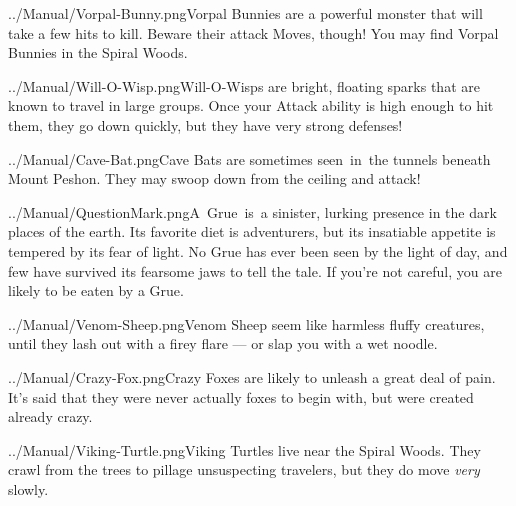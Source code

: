 \documentclass[9pt,twocolumn,openany,article]{memoir}
\newcommand\englishskip{\vspace{14pt}}
\begin{document}
{\lettrine[image=true,                lines=4,               findent=3pt,
nindent=3pt]{../Manual/Vorpal-Bunny.png}{}\noindent{}Vorpal  Bunnies are
a  powerful monster  that will  take a  few hits  to kill.  Beware their
attack Moves, though! You may find Vorpal Bunnies in the Spiral Woods.

\englishskip

\lettrine[image=true,                lines=4,               findent=3pt,
nindent=3pt]{../Manual/Will-O-Wisp.png}{}\noindent{}Will-O-Wisps     are
bright,  floating sparks  that  are  known to  travel  in large  groups.
Once  your Attack  ability is  high  enough to  hit them,  they go  down
quickly, but they have very strong defenses!

\englishskip

\lettrine[image=true,                lines=4,               findent=3pt,
nindent=3pt]{../Manual/Cave-Bat.png}{}\noindent{}Cave Bats are sometimes
seen~in~the tunnels beneath  Mount Peshon. They may swoop  down from the
ceiling and attack!

\englishskip

\lettrine[image=true,                lines=4,               findent=3pt,
nindent=3pt]{../Manual/QuestionMark.png}{}\noindent{}A~Grue~is~a
sinister, lurking presence in the dark places of the earth. Its favorite
diet is adventurers, but its insatiable appetite is tempered by its fear
of light. No Grue  has ever been seen by the light of  day, and few have
survived its fearsome jaws to tell  the tale. If you're not careful, you
are likely to be eaten by a Grue.

\englishskip

\lettrine[image=true,                lines=4,               findent=3pt,
nindent=3pt]{../Manual/Venom-Sheep.png}{}\noindent{}Venom   Sheep   seem
like  harmless  fluffy creatures,  until  they  lash  out with  a  firey
flare --- or slap you with a wet noodle.

\englishskip

\lettrine[image=true,                lines=4,               findent=3pt,
nindent=3pt]{../Manual/Crazy-Fox.png}{}\noindent{}Crazy Foxes are likely
to unleash a great deal of pain. It's said that they were never actually
foxes to begin with, but were created already crazy.

\ifdefined\ATARIAGESAVE\pagebreak\else\englishskip\fi

\lettrine[image=true,                lines=4,               findent=3pt,
nindent=3pt]{../Manual/Viking-Turtle.png}{}\noindent{}Viking     Turtles
live  near the  Spiral  Woods.  They crawl  from  the  trees to  pillage
unsuspecting travelers, but they do move \emph{very} slowly.

}
\end{document}
